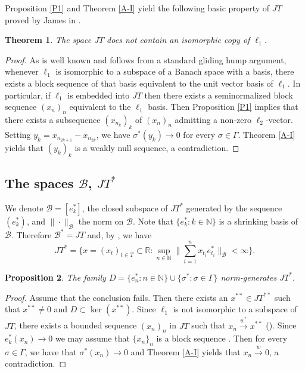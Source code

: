 \documentclass[12pt]{amsart}
\theoremstyle{plain}
\numberwithin{equation}{section}
\newcommand{\N}{\mathbb{N}}
\newcommand{\R}{\mathbb{R}}
\newcommand{\B}{\mathcal{B}}
\newtheorem{theorem}{Theorem}[section]
\newtheorem{proposition}[theorem]{Proposition}
\begin{document}
Proposition \ref{P1} and Theorem \ref{A-I} yield the following basic property of $JT$ proved by James in \cite{James:74}.

\begin{theorem}\label{TH_JT}
The space $JT$ does not contain an isomorphic copy of $\ell_1$.
\end{theorem}
\begin{proof}
As is well known and follows from a standard gliding hump argument, whenever $\ell_1$ is isomorphic to a subspace of a Banach space with a basis, there exists a block sequence of that basis equivalent to the unit vector basis of $\ell_1$. In particular, if $\ell_1$ is embedded into $JT$ then there exists a seminormalized block sequence $(x_n)_n$ equivalent to the $\ell_1$ basis. Then Proposition \ref{P1} implies that there exists a subsequence $(x_{n_k})_k$ of $(x_n)_n$ admitting a non-zero $\ell_2$-vector. Setting $y_k = x_{n_{2k+1}} - x_{n_{2k}}$, we have $\sigma^*(y_k) \to 0$ for every $\sigma \in \Gamma$. Theorem \ref{A-I} yields that $(y_k)_k$ is a weakly null sequence, a contradiction.
\end{proof}

\subsection{The spaces $\B$, $JT^*$}
We denote $\B=[e^*_{k}]$, the closed subspace of $JT^*$ generated by the sequence $(e^*_{k})$, and $\|\cdot\|_\B$ the norm on $\B$. Note that $\{e^*_{k} : k \in \N\}$ is a shrinking basis of $\B$. Therefore $\B^*= JT$ and, by \cite[Proposition 1.b.2]{L-T:77}, we have
\begin{equation}\label{normJT*}
JT^* = \Big\{x=(x_t)_{t\in T}\subset \R : \sup_{n\in\N} \Big\|\sum_{i=1}^n x_{t_i} e^*_{t_i}\Big\|_{\B}< \infty \Big\}.
\end{equation}

\begin{proposition}\label{P3}
The family $D = \{ e_n^* :n\in \N\} \cup \{ \sigma^*: \sigma \in \Gamma\}$ norm-generates $JT^*$.
\end{proposition}
\begin{proof}
Assume that the conclusion fails. Then there exists an $x^{**} \in JT^{**}$ such that $x^{**} \neq 0$ and $D \subset \ker(x^{**})$.
Since $\ell_1$ is not isomorphic to a subspace of $JT$, there exists a bounded sequence $(x_n)_n$ in $JT$ such that $x_n \xrightarrow{w^*} x^{**}$ (\cite{OR}). Since $e_k^*(x_n) \to 0$ we may assume that $\{x_n\}_n$ is a block sequence \cite[Proposition 1.3.10]{Al-K:16}. Then for every $\sigma \in \Gamma$, we have that $\sigma^*(x_n) \to 0$ and Theorem \ref{A-I} yields that $x_n \xrightarrow{w} 0$, a contradiction.
\end{proof}
\end{document}
